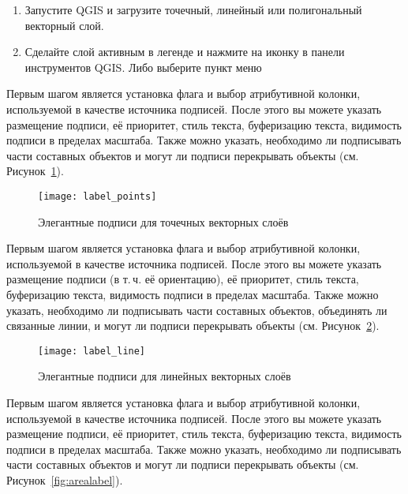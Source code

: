 
\begin{enumerate}
  \item Запустите QGIS и загрузите точечный, линейный или полигональный
  векторный слой.
  \item Сделайте слой активным в легенде и нажмите на иконку
   в панели инструментов QGIS. Либо выберите
пункт меню  \arrow {}
\end{enumerate}


Первым шагом является установка флага 
и выбор атрибутивной колонки, используемой в качестве источника подписей.
После этого вы можете указать размещение подписи, её приоритет, стиль
текста, буферизацию текста, видимость подписи в пределах масштаба. Также
можно указать, необходимо ли подписывать части составных объектов и могут
ли подписи перекрывать объекты (см. Рисунок~\ref{fig:pointlabel}).

\begin{figure}[ht]
\centering
   \texttt{[image: label\_points]}
   \caption{Элегантные подписи для точечных векторных слоёв \wincaption}\label{fig:pointlabel}
\end{figure}


Первым шагом является установка флага 
и выбор атрибутивной колонки, используемой в качестве источника подписей.
После этого вы можете указать размещение подписи (в т.\,ч. её ориентацию),
её приоритет, стиль текста, буферизацию текста, видимость подписи в пределах
масштаба. Также можно указать, необходимо ли подписывать части составных
объектов, объединять ли связанные линии, и могут ли подписи перекрывать объекты
(см. Рисунок~\ref{fig:linelabel}).

\begin{figure}[ht]
\centering
   \texttt{[image: label\_line]}
   \caption{Элегантные подписи для линейных векторных слоёв \wincaption}\label{fig:linelabel}
\end{figure}


Первым шагом является установка флага 
и выбор атрибутивной колонки, используемой в качестве источника подписей.
После этого вы можете указать размещение подписи, её приоритет, стиль
текста, буферизацию текста, видимость подписи в пределах масштаба. Также
можно указать, необходимо ли подписывать части составных объектов и могут
ли подписи перекрывать объекты (см. Рисунок~\ref{fig:arealabel}).


